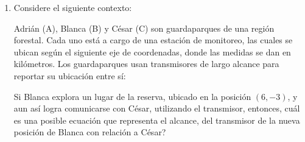 \documentclass[11pt]{article}
\newcommand{\opcion}[2]{\item $#2$}
\newcommand{\rotuloxeste}{\mbox{\textit{x} (este)}}
\newcommand{\rotuloynorte}{\mbox{\textit{y} (norte)}}
\begin{document}
\begin{enumerate}[label=\textbf{\arabic*.}, itemsep=2.5cm]
\begin{center}
\end{center}

De acuerdo con la informaci\'on anterior, \textquestiondown cu\'al es la representaci\'on algebraica, cuyas unidades est\'an en metros, de la circunferencia $C$ correspondiente al alcance m\'aximo del chorro de agua?

\begin{enumerate}[label=\Alph*)]
  \opcion{A}{(x-2)^2+(y+3)^2=16}
  \opcion{B}{(x+2)^2+(y-3)^2=16}
  \opcion{C}{(x+2)^2+(y-3)^2=8}
  \opcion{D}{(x+2)^2+(y+3)^2=16}
\end{enumerate}

\Needspace{0.88\textheight}
\item
Considere el siguiente contexto:

Adri\'an (A), Blanca (B) y C\'esar (C) son guardaparques de una regi\'on forestal. Cada uno est\'a a cargo de una estaci\'on de monitoreo, las cuales se ubican seg\'un el siguiente eje de coordenadas, donde las medidas se dan en kil\'ometros. Los guardaparques usan transmisores de largo alcance para reportar su ubicaci\'on entre s\'i:

Si Blanca explora un lugar de la reserva, ubicado en la posici\'on $(6,-3)$, y aun as\'i logra comunicarse con C\'esar, utilizando el transmisor, entonces, \textquestiondown cu\'al es una posible ecuaci\'on que representa el alcance, del transmisor de la nueva posici\'on de Blanca con relaci\'on a C\'esar?


\end{enumerate}
\end{document}
